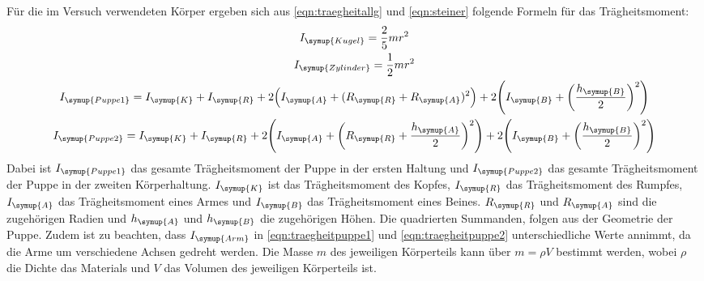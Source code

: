 Für die im Versuch verwendeten Körper ergeben sich aus \eqref{eqn:traegheitallg}
und \eqref{eqn:steiner} folgende Formeln für das Trägheitsmoment:
\begin{gather}
  I_{\symup{Kugel}}=\frac{2}{5}mr^2
  \label{eqn:traegheitkugel} \\
  I_{\symup{Zylinder}}=\frac{1}{2}mr^2
  \label{eqn:traegheitzylinder} \\
  \begin{split}
    I_{\symup{Puppe1}}=I_{\symup{K}}+I_{\symup{R}}
    +2\Bigl(I_{\symup{A}}+(R_{\symup{R}}+R_{\symup{A}})^2\Bigr)
    +2\Biggl(I_{\symup{B}}+\biggl(\frac{h_{\symup{B}}}{2}\biggr)^2\Biggr)
    \label{eqn:traegheitpuppe1}
  \end{split}
  \\
  \begin{split}
    I_{\symup{Puppe2}}=I_{\symup{K}}+I_{\symup{R}}
    +2\Biggl(I_{\symup{A}}+\biggl(R_{\symup{R}}+\frac{h_{\symup{A}}}{2}\biggr)^2\Biggr)
    +2\Biggl(I_{\symup{B}}+\biggl(\frac{h_{\symup{B}}}{2}\biggr)^2\Biggr)
    \label{eqn:traegheitpuppe2}
  \end{split}
\end{gather}
Dabei ist $I_{\symup{Puppe1}}$ das gesamte Trägheitsmoment der Puppe in der ersten
Haltung und $I_{\symup{Puppe2}}$ das gesamte Trägheitsmoment der Puppe in der
zweiten Körperhaltung. $I_{\symup{K}}$ ist das Trägheitsmoment des Kopfes, $I_{\symup{R}}$
das Trägheitsmoment des Rumpfes, $I_{\symup{A}}$ das Trägheitsmoment eines Armes und
$I_{\symup{B}}$ das Trägheitsmoment eines Beines. $R_{\symup{R}}$ und $R_{\symup{A}}$ sind die zugehörigen
Radien und $h_{\symup{A}}$ und $h_{\symup{B}}$ die zugehörigen Höhen. Die quadrierten Summanden,
folgen aus der Geometrie der Puppe. Zudem ist zu beachten, dass $I_{\symup{Arm}}$
in \eqref{eqn:traegheitpuppe1} und \eqref{eqn:traegheitpuppe2} unterschiedliche Werte
annimmt, da die Arme um verschiedene Achsen gedreht werden. Die Masse $m$ des jeweiligen
Körperteils kann über $m=\rho V$ bestimmt werden, wobei $\rho$ die Dichte das Materials und
$V$ das Volumen des jeweiligen Körperteils ist.
